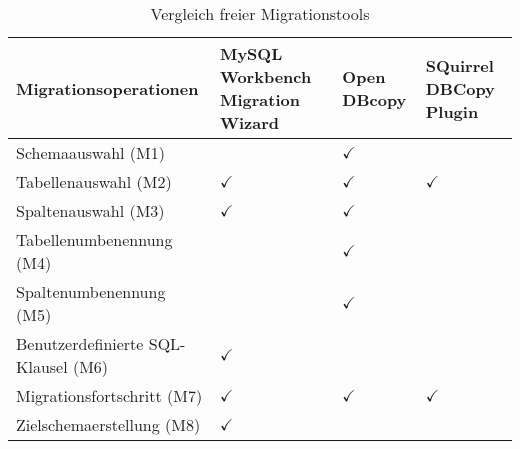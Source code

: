 \begin{table}[H]
	\caption{Vergleich freier Migrationstools}
	\begin{center}
		\begin{tabular}{ |p{4.5cm}|p{2.5cm}|p{2.5cm}|p{2.5cm}| }
			\hline
			\textbf{Migrationsoperationen} & \textbf{MySQL Workbench Migration Wizard} & \textbf{Open DBcopy} & \textbf{SQuirrel DBCopy Plugin}  \\
			\hline
			Schemaauswahl (M1) &  & $\checkmark$& \\
			\hline
			Tabellenauswahl (M2) & $\checkmark$ & $\checkmark$& $\checkmark$ \\
			\hline
			Spaltenauswahl (M3) & $\checkmark$& $\checkmark$& \\
			\hline
			Tabellenumbenennung (M4)& &$\checkmark$ & \\
			\hline
			Spaltenumbenennung (M5)& & $\checkmark$& \\
			\hline
			Benutzerdefinierte SQL-Klausel (M6)& $\checkmark$& & \\
			\hline
			Migrationsfortschritt (M7)& $\checkmark$& $\checkmark$& $\checkmark$ \\
			\hline
			Zielschemaerstellung (M8)&$\checkmark$ & & \\
			\hline
		\end{tabular}
	\end{center}
	\label{table:tools2}
\end{table}
%
%
%


